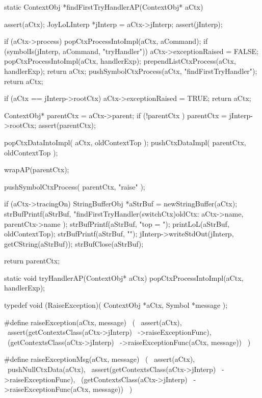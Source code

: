 \startCCode
static ContextObj *findFirstTryHandlerAP(ContextObj* aCtx) {
  assert(aCtx);
  JoyLoLInterp *jInterp = aCtx->jInterp;
  assert(jInterp);

  if (aCtx->process) {
    popCtxProcessIntoImpl(aCtx, aCommand);
    if (symbolIs(jInterp, aCommand, "tryHandler")) {
      aCtx->exceptionRaised = FALSE;
      popCtxProcessIntoImpl(aCtx, handlerExp);
      prependListCtxProcess(aCtx, handlerExp);
      return aCtx;
    }
    pushSymbolCtxProcess(aCtx, "findFirstTryHandler");
    return aCtx;
  }

  if (aCtx == jInterp->rootCtx) {
    aCtx->exceptionRaised = TRUE;
    return aCtx;
  }
  
  ContextObj* parentCtx = aCtx->parent;
  if (!parentCtx ) parentCtx = jInterp->rootCtx;
  assert(parentCtx);
  
  popCtxDataIntoImpl(   aCtx,      oldContextTop );
  pushCtxDataImpl(      parentCtx, oldContextTop );
  
  wrapAP(parentCtx);
  
  pushSymbolCtxProcess( parentCtx, "raise"       );

  if (aCtx->tracingOn) {
    StringBufferObj *aStrBuf = newStringBuffer(aCtx);
    strBufPrintf(aStrBuf,
      "findFirstTryHandler(switchCtx)\n oldCtx: %
      aCtx->name, parentCtx->name
    );
    strBufPrintf(aStrBuf, "top = ");
    printLoL(aStrBuf, oldContextTop);
    strBufPrintf(aStrBuf, "\n");
    jInterp->writeStdOut(jInterp, getCString(aStrBuf));
    strBufClose(aStrBuf);
  }

  return parentCtx;
}
\stopCCode

\startCCode
static void tryHandlerAP(ContextObj* aCtx) {
  popCtxProcessIntoImpl(aCtx, handlerExp);
}
\stopCCode

\startCHeader
typedef void (RaiseException)(
  ContextObj *aCtx,
  Symbol     *message
);

#define raiseException(aCtx, message)       \
  (                                         \
    assert(aCtx),                           \
    assert(getContextsClass(aCtx->jInterp)  \
      ->raiseExceptionFunc),                \
    (getContextsClass(aCtx->jInterp)        \
      ->raiseExceptionFunc(aCtx, message))  \
  )

#define raiseExceptionMsg(aCtx, message)    \
  (                                         \
    assert(aCtx),                           \
    pushNullCtxData(aCtx),                  \
    assert(getContextsClass(aCtx->jInterp)  \
      ->raiseExceptionFunc),                \
    (getContextsClass(aCtx->jInterp)        \
      ->raiseExceptionFunc(aCtx, message))  \
  )
\stopCHeader

